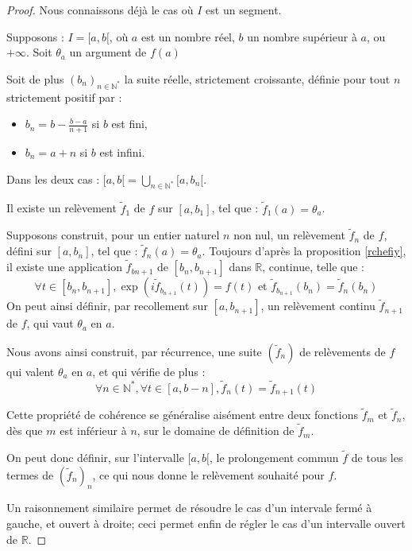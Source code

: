 \begin{proof}
Nous connaissons d\'ej\`a le cas o\`u $I$ est un segment.

\par
Supposons : $I=[a,b[$, o\`u $a$ est un nombre r\'eel, $b$ un nombre sup\'erieur \`a $a$, ou $+\infty$. Soit $\theta_a$ un argument de $f(a)$

\par
Soit de plus $(b_n)_{n\in\mathbb{N}^{\ast}}$ la suite r\'eelle, strictement croissante, d\'efinie pour tout $n$ strictement positif par :
\begin{itemize}
\item $b_n=b-\frac{b-a}{n+1}$ si $b$ est fini,
\item $b_n=a+n$ si $b$ est infini.
\end{itemize}
Dans les deux cas : $[a,b[=\underset{n\in\mathbb{N}^{\ast}}{\bigcup}[a,b_n[$.

\par
Il existe un rel\`evement $\tilde{f}_1$ de $f$ sur $[a,b_1]$,  tel que : $\tilde{f}_1(a)=\theta_a$.

\par
Supposons construit, pour un entier naturel $n$ non nul, un rel\`evement $\tilde{f}_n$ de $f$, d\'efini sur $[a,b_n]$, tel que : $\tilde{f}_n(a)=\theta_a$. %
Toujours d'apr\`es la proposition \ref{rchefiy}, %
il existe une application $\tilde{f}_{b{n+1}}$ de $[b_n,b_{n+1}]$ dans $\mathbb{R}$, continue, telle que :
\[\forall t \in [b_n,b_{n+1}], \exp (i\tilde{f}_{b_{n+1}}(t))=f(t) \text{ et }\tilde{f}_{b_{n+1}}(b_n)=\tilde{f}_n(b_n)\]
On peut ainsi d\'efinir, par recollement sur $[a,b_{n+1}]$, un rel\`evement continu $\tilde{f}_{n+1}$ de $f$, qui vaut $\theta_a$ en $a$.

\par
Nous avons ainsi construit, par r\'ecurrence, une suite $(\tilde{f}_n)$ de rel\`evements de $f$ qui valent $\theta_a$ en $a$, et qui v\'erifie de plus :
\[\forall n \in\mathbb{N}^{\ast}, \forall t \in [a,b-n], \tilde{f}_n(t)=\tilde{f}_{n+1}(t)\]

Cette propri\'et\'e de coh\'erence se g\'en\'eralise ais\'ement entre deux fonctions $\tilde{f}_m$ et $\tilde{f}_n$, %
d\`es que $m$ est inf\'erieur \`a $n$, sur le domaine de d\'efinition de $\tilde{f}_m$.

\par
On peut donc d\'efinir, sur l'intervalle $[a,b[$, le prolongement commun $\tilde{f}$ de tous les termes de $(\tilde{f}_n)_n$, %
ce qui nous donne le rel\`evement souhait\'e pour $f$.

\par
Un raisonnement similaire permet de r\'esoudre le cas d'un intervale ferm\'e \`a gauche, et ouvert \`a droite; %
ceci permet enfin de r\'egler le cas d'un intervalle ouvert de $\mathbb{R}$.
\end{proof}

